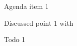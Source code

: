 




	\begin{agenda}
		\item Agenda item 1
	\end{agenda}


	\begin{decisions}
		\point Discussed point 1 with 
	\end{decisions}


	\begin{todos}
		\todo Todo 1
	\end{todos}


